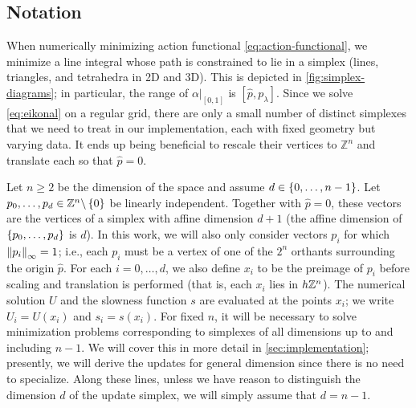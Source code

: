 \documentclass[sisc-eikonal.tex]{subfiles}
\begin{document}
\subsection{Notation}

When numerically minimizing action functional
\cref{eq:action-functional}, we minimize a line integral whose path is
constrained to lie in a simplex (lines, triangles, and tetrahedra in
2D and 3D). This is depicted in \cref{fig:simplex-diagrams}; in
particular, the range of $\left. \alpha \right|_{[0, 1]}$ is
$[\hat{p}, p_{\lambda}]$. Since we solve \cref{eq:eikonal} on a
regular grid, there are only a small number of distinct simplexes that
we need to treat in our implementation, each with fixed geometry but
varying data. It ends up being beneficial to rescale their vertices to
$\mathbb{Z}^n$ and translate each so that $\hat{p} = 0$.

Let $n \geq 2$ be the dimension of the space and assume
$d \in \left\{0, \hdots, n - 1\right\}$. Let
$p_0, \hdots, p_d \in \mathbb{Z}^n \backslash \left\{0\right\}$ be linearly
independent. Together with $\hat{p} = 0$, these vectors are the
vertices of a simplex with affine dimension $d + 1$ (the affine
dimension of $\left\{p_0, \hdots, p_d\right\}$ is $d$). In this work, we will
also only consider vectors $p_i$ for which $\left\|p_i\right\|_\infty = 1$;
i.e., each $p_i$ must be a vertex of one of the $2^n$ orthants
surrounding the origin $\hat{p}$. For each $i = 0, \hdots, d$, we also
define $x_i$ to be the preimage of $p_i$ before scaling and
translation is performed (that is, each $x_i$ lies in $h \mathbb{Z}^n$). The
numerical solution $U$ and the slowness function $s$ are evaluated at
the points $x_i$; we write $U_i = U(x_i)$ and $s_i = s(x_i)$. For
fixed $n$, it will be necessary to solve minimization problems
corresponding to simplexes of all dimensions up to and including
$n - 1$. We will cover this in more detail in
\cref{sec:implementation}; presently, we will derive the updates for
general dimension since there is no need to specialize. Along these
lines, unless we have reason to distinguish the dimension $d$ of the
update simplex, we will simply assume that $d = n - 1$.
\end{document}
